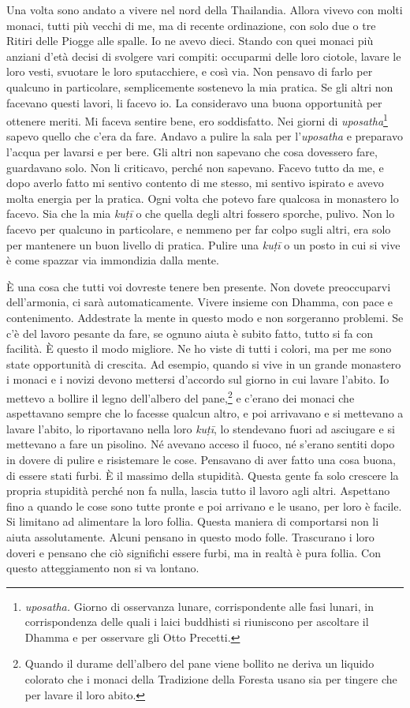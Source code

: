 Una volta sono andato a vivere nel nord della Thailandia. Allora vivevo
con molti monaci, tutti più vecchi di me, ma di recente ordinazione, con
solo due o tre Ritiri delle Piogge alle spalle. Io ne avevo dieci.
Stando con quei monaci più anziani d'età decisi di svolgere vari
compiti: occuparmi delle loro ciotole, lavare le loro vesti, svuotare le
loro sputacchiere, e così via. Non pensavo di farlo per qualcuno in
particolare, semplicemente sostenevo la mia pratica. Se gli altri non
facevano questi lavori, li facevo io. La consideravo una buona
opportunità per ottenere meriti. Mi faceva sentire bene, ero
soddisfatto. Nei giorni di \emph{uposatha}\footnote{\emph{uposatha.}
  Giorno di osservanza lunare, corrispondente alle fasi lunari, in
  corrispondenza delle quali i laici buddhisti si riuniscono per
  ascoltare il Dhamma e per osservare gli Otto Precetti.} sapevo quello
che c'era da fare. Andavo a pulire la sala per l'\emph{uposatha} e
preparavo l'acqua per lavarsi e per bere. Gli altri non sapevano che
cosa dovessero fare, guardavano solo. Non li criticavo, perché non
sapevano. Facevo tutto da me, e dopo averlo fatto mi sentivo contento di
me stesso, mi sentivo ispirato e avevo molta energia per la pratica.
Ogni volta che potevo fare qualcosa in monastero lo facevo. Sia che la
mia \emph{kuṭī} o che quella degli altri fossero sporche, pulivo. Non lo
facevo per qualcuno in particolare, e nemmeno per far colpo sugli altri,
era solo per mantenere un buon livello di pratica. Pulire una
\emph{kuṭī} o un posto in cui si vive è come spazzar via immondizia
dalla mente.

È una cosa che tutti voi dovreste tenere ben presente. Non dovete
preoccuparvi dell'armonia, ci sarà automaticamente. Vivere insieme con
Dhamma, con pace e contenimento. Addestrate la mente in questo modo e
non sorgeranno problemi. Se c'è del lavoro pesante da fare, se ognuno
aiuta è subito fatto, tutto si fa con facilità. È questo il modo
migliore. Ne ho viste di tutti i colori, ma per me sono state
opportunità di crescita. Ad esempio, quando si vive in un grande
monastero i monaci e i novizi devono mettersi d'accordo sul giorno in
cui lavare l'abito. Io mettevo a bollire il legno dell'albero del
pane,\footnote{Quando il durame dell'albero del pane viene bollito ne
  deriva un liquido colorato che i monaci della Tradizione della Foresta
  usano sia per tingere che per lavare il loro abito.} e c'erano dei
monaci che aspettavano sempre che lo facesse qualcun altro, e poi
arrivavano e si mettevano a lavare l'abito, lo riportavano nella loro
\emph{kuṭī}, lo stendevano fuori ad asciugare e si mettevano a fare un
pisolino. Né avevano acceso il fuoco, né s'erano sentiti dopo in dovere
di pulire e risistemare le cose. Pensavano di aver fatto una cosa buona,
di essere stati furbi. È il massimo della stupidità. Questa gente fa
solo crescere la propria stupidità perché non fa nulla, lascia tutto il
lavoro agli altri. Aspettano fino a quando le cose sono tutte pronte e
poi arrivano e le usano, per loro è facile. Si limitano ad alimentare la
loro follia. Questa maniera di comportarsi non li aiuta assolutamente.
Alcuni pensano in questo modo folle. Trascurano i loro doveri e pensano
che ciò significhi essere furbi, ma in realtà è pura follia. Con questo
atteggiamento non si va lontano.

